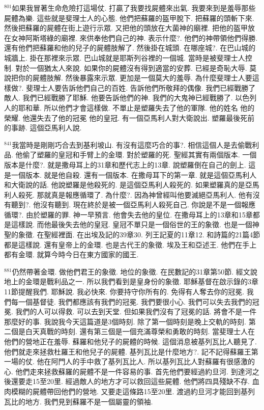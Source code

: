 \documentclass{book}
\begin{document}
$^{801}$如果我冒著生命危險打這場仗.
打贏了我要找屍體來出氣.
我要來到是羞辱那些屍體為樂.
這些就是斐理士人的心態.
他們把蘇羅的盔甲脫下.
把蘇羅的頭斬下來.
然後把蘇羅的屍體在街上遊行示眾.
又把他的頭放在大菌神的廟裡.
把他的盔甲放在女神阿斯塔綠的廟裡.
來供奉他們自己的神.
表示什麼?.
他們的神帶領他們得勝.
還有他們把蘇羅和他的兒子的屍體肢解了.
然後掛在城頭.
在哪座城?.
在巴山城的城牆上.
掛在那裡來示眾.
巴山城就是耶斯列谷裡的一個城.
當時是被斐理士人控制.
對於一個猶太人來說.
如果你的屍體沒有得到適當的安葬.
已經是奇恥大辱.
莫說把你的屍體肢解.
然後暴露來示眾.
更加是一個莫大的羞辱.
為什麼斐理士人要這樣做?.
斐理士人要告訴他們自己的百姓.
告訴他們所敬拜的偶像.
我們已經戰勝了敵人.
我們已經戰勝了耶穌.
他要告訴他們的神.
我們的大鬼神已經戰勝了.
以色列人的耶和華.
所以他們才會這樣做.
不單止是塑羅失去了他的軍隊.
他的姓名 他的榮耀.
他還失去了他的冠冕 他的皇冠.
有一個亞馬利人對大衛說出.
塑羅最後死前的事跡.
這個亞馬利人說.

$^{841}$我當時是剛剛巧合去到基利坡山.
有沒有這麼巧合的事?.
相信這個人是去偷戰利品.
他偷了塑羅的皇冠和手臂上的金環.
對於塑羅的死.
聖經其實有兩個版本.
一個版本是什麼?.
就是撒母耳上的31章和歷代志上的13章.
說塑羅倒在自己的劍上.
這是一個版本.
就是他自殺.
還有一個版本.
在撒母耳下的第一章.
就是這個亞馬利人和大衛說的話.
他說塑羅是他殺死的.
是這個亞馬利人殺死的.
如果塑羅真的是亞馬利人殺死.
那就真是報應循環了.
為什麼?.
因為神曾經叫他要滅絕亞馬利人.
他有沒有聽到?.
他沒有聽到.
現在終於是被一個亞馬利人殺死自己.
你說是不是一個報應循環?.
由於塑羅的罪.
神一早預言.
他會失去他的皇位.
在撒母耳上的13章和15章都是這樣說.
而他最後失去他的皇冠.
皇冠不單只是一個俗世的王的象徵.
也是一個神聖的象徵.
在聖經裡面.
在出埃及記的39章30.
列王記夏的11章12.
和詩篇的21篇4節都是這樣說.
還有皇帝上的金環.
也是古代王的象徵.
埃及王和亞述王.
他們在手上都有金環.
就算今時今日在東方國家的國王.

$^{881}$仍然帶著金環.
做他們君王的象徵.
地位的象徵.
在民數記的31章第50節.
經文說地上的金環是戰利品之一.
所以我們看到是皇身份的象徵.
耶穌基督在啟示錄的3章11節提醒我們.
耶穌說.
我必快來.
你要持守你所有的.
免得有人奪去你的冠冕.
我們每一個基督徒.
我們都應該有我們的冠冕.
我們要很小心.
我們可以失去我們的冠冕.
我們的人可以得救.
可以去到天堂.
但如果我們沒有了冠冕的話.
將會不是一件那麼好的事.
我說我今天這篇道是3個時刻.
除了第一個時刻是晚上交軌的時刻.
第二個是白天真戰的時刻.
還有第三個是一個充滿尊榮和勇敢的時刻.
當斐理士人在他們的營地正在羞辱.
蘇羅和他兒子的屍體的時候.
這個消息被基列瓦比人聽見了.
他們就走來拯救杜羅王和他兒子的屍體.
基列瓦比是什麼地方?.
記不記得蘇羅王第一場的仗.
他在阿門人的手中救了基列瓦比人.
所以基列瓦比人對蘇羅有很感激的心.
他們走來拯救蘇羅的屍體不是一件容易的事.
首先他們要經過約旦河.
到達河之後還要走15至20里.
經過敵人的地方才可以救回這些屍體.
他們將四具殘缺不存.
血肉模糊的屍體帶回他們的營地.
又要走這條路15至20里.
渡過約旦河才能回到基列瓦比的地方.
我們見到蘇羅不是一個屬靈的領袖.
\end{document}
